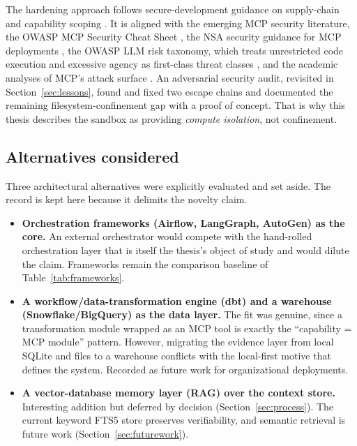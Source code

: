 The hardening approach follows secure-development guidance on supply-chain and capability scoping \cite{openssf2024}. It is aligned with the emerging MCP security literature, the OWASP MCP Security Cheat Sheet \cite{owasp2025mcp}, the NSA security guidance for MCP deployments \cite{nsa2025mcp}, the OWASP LLM risk taxonomy, which treats unrestricted code execution and excessive agency as first-class threat classes \cite{owasp2024llm}, and the academic analyses of MCP's attack surface \cite{zhang2026breakingprotocol,hou2026mcplandscape}. An adversarial security audit, revisited in Section~\ref{sec:lessons}, found and fixed two escape chains and documented the remaining filesystem-confinement gap with a proof of concept. That is why this thesis describes the sandbox as providing \emph{compute isolation}, not confinement.

\subsection{Alternatives considered}
\label{sec:alternatives}

Three architectural alternatives were explicitly evaluated and set aside. The record is kept here because it delimits the novelty claim.

\begin{itemize}
	\item \textbf{Orchestration frameworks (Airflow, LangGraph, AutoGen) as the core.} An external orchestrator would compete with the hand-rolled orchestration layer that is itself the thesis's object of study and would dilute the claim. Frameworks remain the comparison baseline of Table~\ref{tab:frameworks}.
	\item \textbf{A workflow/data-transformation engine (dbt) and a warehouse (Snowflake/\allowbreak{}BigQuery) as the data layer.} The fit was genuine, since a transformation module wrapped as an MCP tool is exactly the ``capability = MCP module'' pattern. However, migrating the evidence layer from local SQLite and files to a warehouse conflicts with the local-first motive that defines the system. Recorded as future work for organizational deployments.
	\item \textbf{A vector-database memory layer (RAG) over the context store.} Interesting addition but deferred by decision (Section~\ref{sec:process}). The current keyword FTS5 store preserves verifiability, and semantic retrieval is future work (Section~\ref{sec:futurework}).
\end{itemize}
